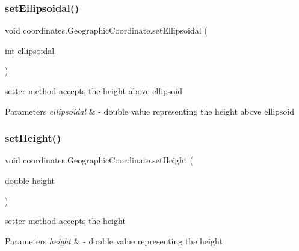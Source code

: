 \subsubsection{\texorpdfstring{set\+Ellipsoidal()}{setEllipsoidal()}}
{\footnotesize\ttfamily void coordinates.\+Geographic\+Coordinate.\+set\+Ellipsoidal (\begin{DoxyParamCaption}\item[{int}]{ellipsoidal }\end{DoxyParamCaption})}



setter method accepts the height above ellipsoid 


\begin{DoxyParams}{Parameters}
{\em ellipsoidal} & -\/ double value representing the height above ellipsoid \\
\hline
\end{DoxyParams}
\mbox{\label{classcoordinates_1_1_geographic_coordinate_ab4d53507e2fb93d1e16bffffcf21ecb4}} 
\subsubsection{\texorpdfstring{set\+Height()}{setHeight()}}
{\footnotesize\ttfamily void coordinates.\+Geographic\+Coordinate.\+set\+Height (\begin{DoxyParamCaption}\item[{double}]{height }\end{DoxyParamCaption})}



setter method accepts the height 


\begin{DoxyParams}{Parameters}
{\em height} & -\/ double value representing the height \\
\hline
\end{DoxyParams}
\mbox{\label{classcoordinates_1_1_geographic_coordinate_a8baf5c2c81a9cd60ca73f74d63509775}} 
